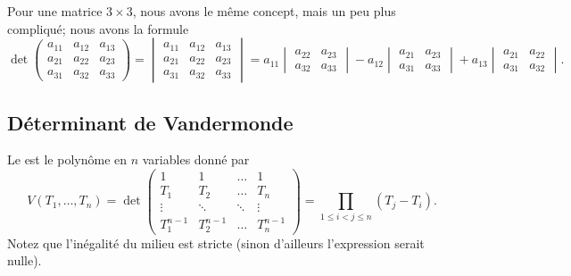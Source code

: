 Pour une matrice $3\times 3$, nous avons le même concept, mais un peu plus compliqué; nous avons la formule
\begin{equation}
    \det
    \begin{pmatrix}
        a_{11}    &   a_{12}    &   a_{13}    \\
        a_{21}    &   a_{22}    &   a_{23}    \\
        a_{31}    &   a_{32}    &   a_{33}    
    \end{pmatrix}
    =
    \begin{vmatrix}
        a_{11}    &   a_{12}    &   a_{13}    \\
        a_{21}    &   a_{22}    &   a_{23}    \\
        a_{31}    &   a_{32}    &   a_{33}    
    \end{vmatrix}=
    a_{11}\begin{vmatrix}
        a_{22}  &   a_{23}    \\ 
        a_{32}    &   a_{33}    
    \end{vmatrix}-
    a_{12}\begin{vmatrix}
        a_{21}  &   a_{23}    \\ 
        a_{31}    &   a_{33}
    \end{vmatrix}+
    a_{13}\begin{vmatrix}
        a_{21}  &   a_{22}    \\ 
        a_{31}    &   a_{32}
    \end{vmatrix}.
\end{equation}


\subsection{Déterminant de Vandermonde}

\begin{proposition}  \label{PropnuUvtj}
    Le  est le polynôme en \( n\) variables donné par
    \begin{equation}
        V(T_1,\ldots, T_n)=\det\begin{pmatrix}
             1   &   1    &   \ldots    &   1    \\
             T_1   &   T_2    &   \ldots    &   T_n    \\
             \vdots   &   \ddots    &   \ddots    &   \vdots    \\ 
             T_1^{n-1}   &   T_2^{n-1}    &   \ldots    &   T_n^{n-1}     
         \end{pmatrix}=\prod_{1\leq i<j\leq n}(T_j-T_i).
    \end{equation}
    Notez que l'inégalité du milieu est stricte (sinon d'ailleurs l'expression serait nulle).
\end{proposition}

